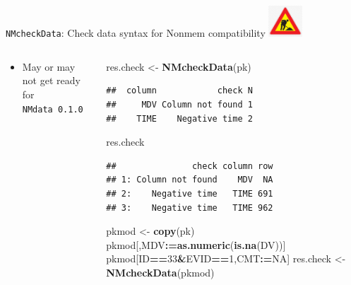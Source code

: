 \documentclass[
  8pt,
  ignorenonframetext,
  aspectratio=169]{beamer}
\newenvironment{Shaded}{\begin{snugshade}}{\end{snugshade}}
\newcommand{\DecValTok}[1]{\textcolor[rgb]{0.00,0.00,0.81}{#1}}
\newcommand{\ErrorTok}[1]{\textcolor[rgb]{0.64,0.00,0.00}{\textbf{#1}}}
\newcommand{\KeywordTok}[1]{\textcolor[rgb]{0.13,0.29,0.53}{\textbf{#1}}}
\newcommand{\NormalTok}[1]{#1}
\newcommand{\OperatorTok}[1]{\textcolor[rgb]{0.81,0.36,0.00}{\textbf{#1}}}
\newcommand{\OtherTok}[1]{\textcolor[rgb]{0.56,0.35,0.01}{#1}}
\newcommand{\StringTok}[1]{\textcolor[rgb]{0.31,0.60,0.02}{#1}}
\providecommand{\tightlist}{%
  \setlength{\itemsep}{0pt}\setlength{\parskip}{0pt}}
\begin{document}
\begin{frame}[fragile]{\texttt{NMcheckData}: Check data syntax for
Nonmem compatibility
\includegraphics[width=0.5in]{figures/worksign.png}}
\begin{columns}[T]
\begin{column}{0.48\textwidth}
\begin{itemize}
  \begin{itemize}
  \tightlist
  \item
    `NMcheckData is a ``look but don't touch'' function, so worst case
    is output is confusing.
  \item
    You could get a strange error due to ``holes'' in the function that
    haven't yet been implemented.
  \end{itemize}
\item
  May or may not get ready for \texttt{NMdata\ 0.1.0}
\end{itemize}
\end{column}

\begin{column}{0.48\textwidth}
\scriptsize

\begin{Shaded}
\begin{Highlighting}[]
\NormalTok{res.check \textless{}{-}}\StringTok{ }\KeywordTok{NMcheckData}\NormalTok{(pk)}
\end{Highlighting}
\end{Shaded}

\begin{verbatim}
##  column            check N
##     MDV Column not found 1
##    TIME    Negative time 2
\end{verbatim}

\begin{Shaded}
\begin{Highlighting}[]
\NormalTok{res.check}
\end{Highlighting}
\end{Shaded}

\begin{verbatim}
##               check column row
## 1: Column not found    MDV  NA
## 2:    Negative time   TIME 691
## 3:    Negative time   TIME 962
\end{verbatim}

\begin{Shaded}
\begin{Highlighting}[]
\NormalTok{pkmod \textless{}{-}}\StringTok{ }\KeywordTok{copy}\NormalTok{(pk)}
\NormalTok{pkmod[,MDV}\OperatorTok{:}\ErrorTok{=}\KeywordTok{as.numeric}\NormalTok{(}\KeywordTok{is.na}\NormalTok{(DV))]}
\NormalTok{pkmod[ID}\OperatorTok{==}\DecValTok{33}\OperatorTok{\&}\NormalTok{EVID}\OperatorTok{==}\DecValTok{1}\NormalTok{,CMT}\OperatorTok{:}\ErrorTok{=}\OtherTok{NA}\NormalTok{]}
\NormalTok{res.check \textless{}{-}}\StringTok{ }\KeywordTok{NMcheckData}\NormalTok{(pkmod)}
\end{Highlighting}
\end{Shaded}


\end{column}
\end{columns}
\end{frame}
\end{document}
